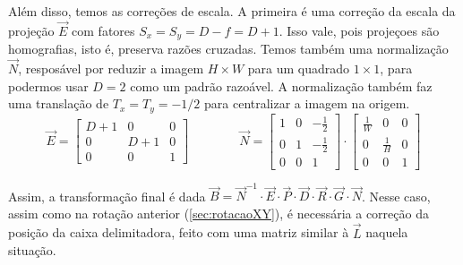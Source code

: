     Além disso, temos as correções de escala. A primeira é uma correção da escala da projeção $\vec{E}$ com fatores $S_x = S_y = D - f = D + 1$. Isso vale, pois projeçoes são homografias, isto é, preserva razões cruzadas. Temos também uma normalização $\vec{N}$, resposável por reduzir a imagem $H \times W$ para um quadrado $1 \times 1$, para podermos usar $D = 2$ como um padrão razoável. A normalização também faz uma translação de $T_x = T_y = -1/2$ para centralizar a imagem na origem.
    \[
        \vec{E} = \begin{bmatrix}
            D + 1 & 0 & 0 \\
            0 & D + 1 & 0 \\
            0 & 0 & 1
        \end{bmatrix}
        \qquad \qquad
        \vec{N} = \begin{bmatrix}
            1 & 0 & -\frac{1}{2} \\
            0 & 1 & -\frac{1}{2} \\
            0 & 0 & 1
        \end{bmatrix} \cdot \begin{bmatrix}
            \frac{1}{W} & 0 & 0 \\
            0 & \frac{1}{H} & 0 \\
            0 & 0 & 1
        \end{bmatrix}
    \]

    Assim, a transformação final é dada $\vec{B} = \vec{N}^{-1} \cdot \vec{E} \cdot \vec{P} \cdot \vec{D} \cdot \vec{R} \cdot \vec{G} \cdot \vec{N}$. Nesse caso, assim como na rotação anterior (\cref{sec:rotacaoXY}), é necessária a correção da posição da caixa delimitadora, feito com uma matriz similar à $\vec{L}$ naquela situação.
